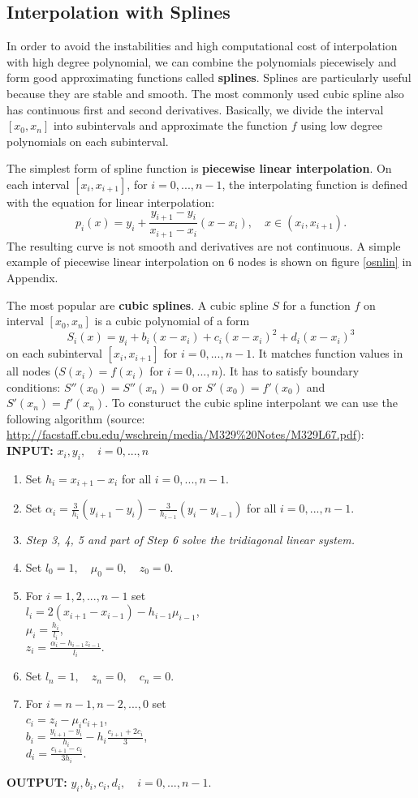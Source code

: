 \documentclass[a4paper,10pt]{article}
\begin{document}
\subsection{Interpolation with Splines}
In order to avoid the instabilities and high computational cost of interpolation with high degree polynomial, we can combine the polynomials piecewisely and form good approximating functions called \textbf{splines}. Splines are particularly useful because they are stable and smooth. The most commonly used cubic spline also has continuous first and second derivatives. Basically, we divide the interval $[x_0,x_n]$ into subintervals and approximate the function $f$ using low degree polynomials on each subinterval.

The simplest form of spline function is \textbf{piecewise linear interpolation}. On each interval $[x_i,x_{i+1}]$, for $i=0,...,n-1$, the interpolating function is defined with the equation for linear interpolation:
$$p_i(x)=y_i+\frac{y_{i+1}-y_i}{x_{i+1}-x_i}(x-x_i), \quad x\in (x_i,x_{i+1}).$$
The resulting curve is not smooth and derivatives are not continuous. A simple example of piecewise linear interpolation on 6 nodes is shown on figure \ref{osnlin} in Appendix. \cite{Woodford}

The most popular are \textbf{cubic splines}. A cubic spline $S$ for a function $f$ on interval $[x_0,x_n]$ is a cubic polynomial of a form $$S_i(x)=y_i+b_i(x-x_i)+c_i(x-x_i)^2+d_i(x-x_i)^3$$ on each subinterval $[x_i, x_{i+1}]$ for $i=0,...,n-1$. It matches function values in all nodes ($S(x_i)=f(x_i)$ for $i=0,...,n$). It has to satisfy boundary conditions: $S''(x_0)=S''(x_n)=0$ or $S'(x_0)=f'(x_0)$ and $S'(x_n)=f'(x_n)$. To consturuct the cubic spline interpolant we can use the following algorithm (source: \url{http://facstaff.cbu.edu/wschrein/media/M329%20Notes/M329L67.pdf}):\\
\textbf{INPUT:} $x_i, y_i, \quad i=0,...,n$ \\
\begin{enumerate}
\item{Set $h_i=x_{i+1}-x_i$ for all $i=0,...,n-1.$}
\item{Set $\alpha_i=\frac{3}{h_i}(y_{i+1}-y_i)-\frac{3}{h_{i-1}}(y_{i}-y_{i-1})$ for all $i=0,...,n-1.$}
\item[]{\textit{Step 3, 4, 5 and part of Step 6 solve the tridiagonal linear system.}}
\item{Set $l_0=1, \quad \mu_0=0, \quad z_0=0.$}
\item{For $i=1,2,...,n-1$ set\\ $l_i=2(x_{i+1}-x_{i-1})-h_{i-1}\mu_{i-1}$,\\
$\mu_i=\frac{h_i}{l_i}$,\\
$z_i=\frac{\alpha_i-h_{i-1}z_{i-1}}{l_i}.$}
\item{Set $l_n=1, \quad z_n=0, \quad c_n=0.$}
\item{For $i=n-1,n-2,...,0$ set\\ $c_i=z_i-\mu_ic_{i+1}$,\\
$b_i=\frac{y_{i+1}-y_i}{h_i}-h_i\frac{c_{i+1}+2c_i}{3}$,\\
$d_i=\frac{c_{i+1}-c_i}{3h_i}.$}
\end{enumerate}
\textbf{OUTPUT:} $y_i,b_i,c_i,d_i, \quad i=0,...,n-1.$
\end{document}
